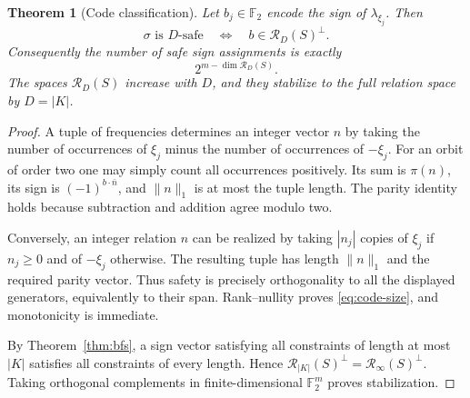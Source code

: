 \documentclass[11pt]{article}
\numberwithin{equation}{section}
\newtheorem{theorem}{Theorem}[section]
\theoremstyle{definition}
\theoremstyle{remark}
\newcommand{\F}{\mathbb F}
\newcommand{\Rel}{\mathcal R}
\begin{document}
\begin{theorem}[Code classification]
\label{thm:code}
Let $b_j\in\F_2$ encode the sign of $\lambda_{\xi_j}$. Then
\begin{equation}
 \sigma\text{ is $D$-safe}
 \quad\Longleftrightarrow\quad
 b\in\Rel_D(S)^\perp.
 \label{eq:safe-code}
\end{equation}
Consequently the number of safe sign assignments is exactly
\begin{equation}
 2^{m-\dim\Rel_D(S)}.
 \label{eq:code-size}
\end{equation}
The spaces $\Rel_D(S)$ increase with $D$, and they stabilize to the full
relation space by $D=|K|$.
\end{theorem}
\begin{proof}
A tuple of frequencies determines an integer vector $n$ by taking the
number of occurrences of $\xi_j$ minus the number of occurrences of
$-\xi_j$. For an orbit of order two one may simply count all occurrences
positively. Its sum is $\pi(n)$, its sign is $(-1)^{b\cdot\bar n}$,
and $\|n\|_1$ is at most the tuple length. The parity identity holds
because subtraction and addition agree modulo two.

Conversely, an integer relation $n$ can be realized by taking $|n_j|$
copies of $\xi_j$ if $n_j\geq0$ and of $-\xi_j$ otherwise. The resulting
tuple has length $\|n\|_1$ and the required parity vector. Thus safety
is precisely orthogonality to all the displayed generators, equivalently
to their span. Rank--nullity proves \eqref{eq:code-size}, and monotonicity
is immediate.

By Theorem~\ref{thm:bfs}, a sign vector satisfying all constraints of
length at most $|K|$ satisfies all constraints of every length. Hence
$\Rel_{|K|}(S)^\perp=\Rel_\infty(S)^\perp$. Taking orthogonal
complements in finite-dimensional $\F_2^m$ proves stabilization.
\end{proof}
\end{document}
